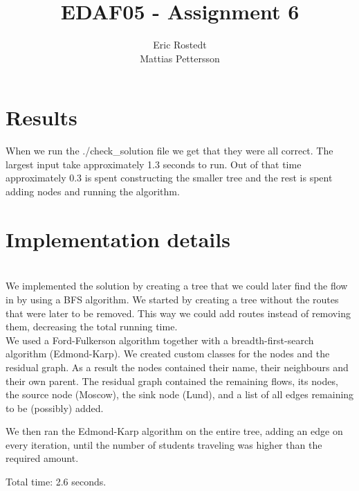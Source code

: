 \documentclass{article}
\title{EDAF05 - Assignment 6}
\author{Eric Rostedt \\ Mattias Pettersson}
\begin{document}
\maketitle

\section{Results}

When we run the ./check\_solution file we get that they were all correct. The largest input take approximately 1.3 seconds to run. Out of that time approximately 0.3 is spent constructing the smaller tree and the rest is spent adding nodes and running the algorithm.

\section{Implementation details}

\\
We implemented the solution by creating a tree that we could later find the flow in by using a BFS algorithm. We started by creating a tree without the routes that were later to be removed. This way we could add routes instead of removing them, decreasing the total running time.\\

We used a Ford-Fulkerson algorithm together with a breadth-first-search algorithm (Edmond-Karp). We created custom classes for the nodes and the residual graph. As a result the nodes contained their name, their neighbours and their own parent. The residual graph contained the remaining flows, its nodes, the source node (Moscow), the sink node (Lund), and a list of all edges remaining to be (possibly) added.

We then ran the Edmond-Karp algorithm on the entire tree, adding an edge on every iteration, until the number of students traveling was higher than the required amount.

Total time: 2.6 seconds.
\end{document}
